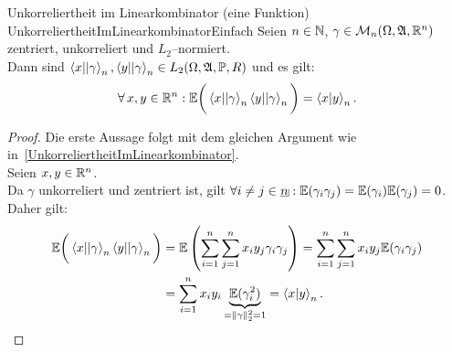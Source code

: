 \begin{lemma}{Unkorreliertheit im Linearkombinator (eine Funktion)}
             {UnkorreliertheitImLinearkombinatorEinfach}
Seien $n \in \mathbb{N}$, $\gamma \in\mathcal{M}_n(\Omega, \mathfrak{A}, \mathbb{R}^n)$ zentriert,
unkorreliert und $L_2$--normiert.\\
Dann sind $\left\langle x ||\gamma\right\rangle _n, \left\langle y ||\gamma\right\rangle_n\in L_2(\Omega,\mathfrak{A},\mathbb{P}, R)$
und es gilt:
\[\forall\, x, y \in \mathbb{R}^n : \mathbb{E}\bigg(\left\langle x ||\gamma\right\rangle _n\left\langle y ||\gamma\right\rangle_n\bigg)
 = \left\langle x |y\right\rangle _n\text.\]
\end{lemma}
\begin{proof}
Die erste Aussage folgt mit dem gleichen Argument wie in~\ref{UnkorreliertheitImLinearkombinator}.\\
Seien $x, y \in \mathbb{R}^n$.\\
Da $\gamma$ unkorreliert und zentriert ist, gilt 
$\forall i\neq j\in\haken n:\E(\gamma_i\gamma_j)=\E(\gamma_i)\E(\gamma_j)=0$.\\
Daher gilt:
\begin{align*}
 \mathbb{E}\bigg(\left\langle x ||\gamma\right\rangle _n\left\langle y ||\gamma\right\rangle_n\bigg)
& = \mathbb{E}\left(\sum_{i=1}^n\sum_{j=1}^n  x_iy_j\gamma_i\gamma_j\right)
= \sum_{i=1}^n\sum_{j=1}^n x_iy_j\mathbb{E}(\gamma_i\gamma_j)\\
&= \sum_{i=1}^n x_iy_i \underbrace{\mathbb{E}(\gamma_i^2)}_{=\lVert\gamma\rVert_2^2 = 1}
= \left\langle x |y\right\rangle_n\text.
\end{align*}
\end{proof}